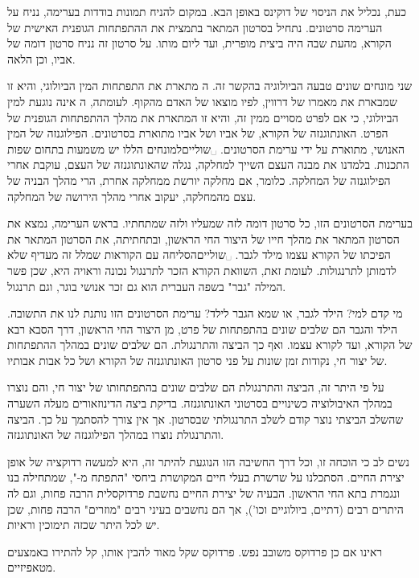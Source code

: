 \begin{enumerate}
כעת, נכליל את הניסוי של דוקינס באופן הבא. במקום להניח תמונות בודדות בערימה,
נניח על הערימה סרטונים. נתחיל בסרטון המתאר בתמצית את ההתפתחות הגופנית האישית של
הקורא, מהעת שבה היה ביצית מופרית, ועד ליום מותו. על סרטון זה נניח סרטון דומה של
אביו, וכן הלאה.

שני מונחים שונים טבעה הביולוגיה בהקשר זה. ה מתארת את התפתחות
המין הביולוגי, והיא זו שמבארת את מאמרו של דרווין, לפיו מוצאו של האדם מהקוף.
לעומתה, ה אינה נוגעת למין הביולוגי, כי אם לפרט מסויים ממין זה,
והיא זו המתארת את מהלך ההתפתחות הגופנית של הפרט. האונתוגנזה של הקורא, של אביו
ושל אביו מתוארת בסרטונים. הפילוגנזה של המין האנושי, מתוארת על ידי ערימת
הסרטונים. ␣שוליים{למונחים הללו יש משמעות בתחום שפות התכנות. בלמדנו את מבנה
העצם השייך למחלקה, נגלה שהאונתוגנזה של העצם, עוקבת אחרי הפילוגנזה של המחלקה.
כלומר, אם מחלקה יורשת ממחלקה אחרת, הרי מהלך הבניה של עצם מהמחלקה, יעקוב אחרי
מהלך הירושה של המחלקה.}

בערימת הסרטונים הזו, כל סרטון דומה לזה שמעליו ולזה שמתחתיו. בראש הערימה, נמצא
את הסרטון המתאר את מהלך חייו של היצור החי הראשון, ובתחתיתה, את הסרטון המתאר את
הפיכתו של הקורא עצמו מילד לגבר. ␣שוליים{הסליחה עם הקוראות שמלל זה מעדיף
שלא לדמותן לתרנגולות. לעומת זאת, השוואת הקורא הזכר לתרנגול נכונה וראויה היא,
שכן פשר המילה "גבר" בשפה העברית הוא גם זכר אנושי בוגר, וגם תרנגול.}

מי קדם למי? הילד לגבר, או שמא הגבר לילד? ערימת הסרטונים הזו נותנת לנו את
התשובה. הילד והגבר הם שלבים שונים בהתפתחות של פרט, מן היצור החי הראשון, דרך
הסבא רבא של הקורא, ועד לקורא עצמו. ואף כך הביצה והתרנגולת. הם שלבים שונים במהלך
ההתפתחות של יצור חי, נקודות זמן שונות על פני סרטון האונתוגנזה של הקורא ושל כל
אבות אבותיו.

על פי היתר זה, הביצה והתרנגולת הם שלבים שונים בהתפתחותו של יצור חי, והם נוצרו
במהלך האיבולוציה כשינויים בסרטוני האונתוגנזה. בדיקת ביצה הדינוזאורים מעלה השערה
שהשלב הביצתי נוצר קודם לשלב התרנגולתי שבסרטון. אך אין צורך להסתמך על כך. הביצה
והתרנגולת נוצרו במהלך הפילוגנזה של האונתוגנזה.

נשים לב כי הוכחה זו, וכל דרך החשיבה הזו הנוגעת להיתר זה, היא למעשה 
{רדוקציה} של אופן יצירת החיים. הסתכלנו על שרשרת בעלי חיים המקושרת ביחסי "התפתח
מ-", שמתחילה בנו ונגמרת בתא החי הראשון. הבעיה של יצירת החיים נחשבת פרדוקסלית
הרבה פחות, וגם לה היתרים רבים (דתיים, ביולוגיים וכו'), אך הם נחשבים בעיני רבים
"מוזרים" הרבה פחות, שכן יש לכל היתר שכזה תימוכין וראיות.  \end{enumerate}
ראינו אם כן פרדוקס משובב נפש. פרדוקס שקל מאוד להבין אותו, קל להתירו באמצעים מטאפיזיים.

